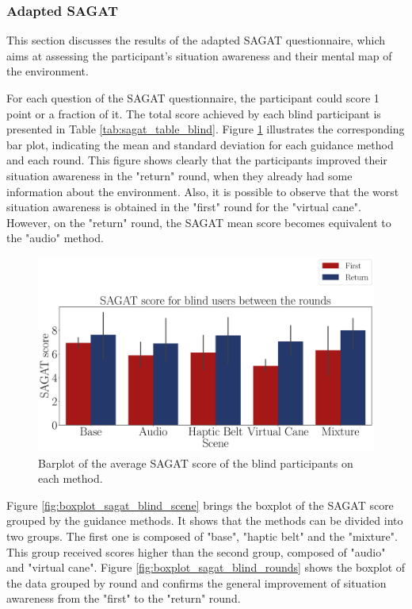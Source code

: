 \subsubsection{Adapted SAGAT}
\label{subsubsec:results_adapted_sagat_1}

This section discusses the results of the adapted SAGAT questionnaire, which aims at assessing the participant's situation awareness and their mental map of the environment. 

For each question of the SAGAT questionnaire, the participant could score 1 point or a fraction of it. The total score achieved by each blind participant is presented in Table \ref{tab:sagat_table_blind}. Figure  \ref{fig:barplot_sagat_avg_5_scene_blind} illustrates the corresponding bar plot, indicating the mean and standard deviation for each guidance method and each round. This figure shows clearly that the participants improved their situation awareness in the "return" round, when they already had some information about the environment. Also, it is possible to observe that the worst situation awareness is obtained in the "first" round for the "virtual cane". However, on the "return" round, the SAGAT mean score becomes equivalent to the "audio" method.



\begin{figure}[!htb]
    \centering
    \includegraphics[width = \textwidth]{Resultados/Sagat/Figuras/pdf/barplot_sagat_avg_5_scene_blind.pdf}
    \caption{Barplot of the average SAGAT score of the blind participants on each method.}
    \label{fig:barplot_sagat_avg_5_scene_blind}
\end{figure}

Figure \ref{fig:boxplot_sagat_blind_scene} brings the boxplot of the SAGAT score grouped by the guidance methods. It shows that the methods can be divided into two groups. The first one is composed of "base", "haptic belt" and the "mixture". This group received scores higher than the second group, composed of "audio" and "virtual cane". Figure \ref{fig:boxplot_sagat_blind_rounds} shows the boxplot of the data grouped by round and confirms the general improvement of situation awareness from the "first" to the "return" round. 

